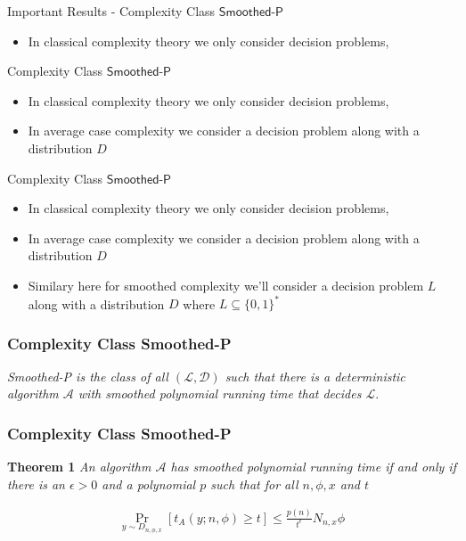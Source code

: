 \begin{frame}{Important Results - Complexity Class $\textsf{Smoothed-P}$}
    \begin{itemize}
        \item In classical complexity theory we only consider decision problems,
    \end{itemize}
\end{frame}

\begin{frame}{Complexity Class $\textsf{Smoothed-P}$}
    \begin{itemize}
        \item In classical complexity theory we only consider decision problems,
        \item In average case complexity we consider a decision problem along with a distribution $D$
    \end{itemize}
\end{frame}

\begin{frame}{Complexity Class $\textsf{Smoothed-P}$}
    \begin{itemize}
        \item In classical complexity theory we only consider decision problems,
        \item In average case complexity we consider a decision problem along with a distribution $D$
        \item Similary here for smoothed complexity we'll consider a decision problem $L$ along with a distribution $D$ where $L \subseteq \{0,1\}^{*}$
    \end{itemize}
\end{frame}

\begin{frame}
    \frametitle{Complexity Class \textsf{Smoothed-P}}

    
    \begin{center}
        \textit{\textsf{Smoothed-P} is the class of all $ (\mathcal{L}, \mathcal{D})$ such that there is a
        deterministic algorithm $\mathcal{A}$ with smoothed polynomial running time that decides $\mathcal{L}$}.
    \end{center}

\end{frame}

\begin{frame}
    \frametitle{Complexity Class \textsf{Smoothed-P}}

    \textbf{Theorem 1} \textit{An algorithm $\mathcal{A}$ has smoothed polynomial running time if and only if
    there is an $\epsilon > 0$ and a polynomial $p$ such that for all $n, \phi, x$ and $t$}

    
    \begin{align*}
        \Pr_{y \sim D_{n, \phi, x}}[t_A(y;n, \phi) \geq t] \leq \frac{p(n)}{t^{\epsilon}} N_{n,x} \phi
    \end{align*}

\end{frame}

